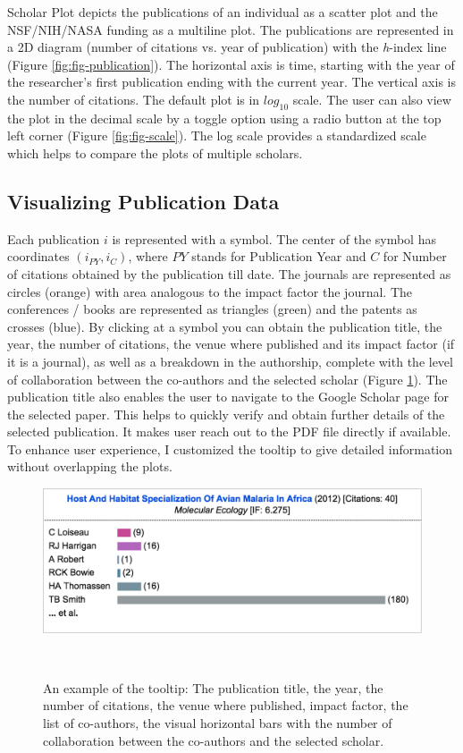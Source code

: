 Scholar Plot depicts the publications of an individual as a scatter plot and the NSF/NIH/NASA funding as a multiline plot. The publications are represented in a 2D diagram (number of citations vs. year of publication) with the {\it h}-index line (Figure \ref{fig:fig-publication}). The horizontal axis is time, starting with the year of the researcher's first publication ending with the current year. The vertical axis is the number of citations. The default plot is in $log_{10}$ scale. The user can also view the plot in the decimal scale by a toggle option using a radio button at the top left corner (Figure \ref{fig:fig-scale}). The log scale provides a standardized scale which helps to compare the plots of multiple scholars.



\subsection{Visualizing Publication Data}
Each publication $i$ is represented with a symbol. The center of the symbol has coordinates $(i_{PY}, i_{C})$, where $PY$ stands for Publication Year and $C$ for Number of citations obtained by the publication till date. The journals are represented as circles (orange) with area analogous to the impact factor the journal. The conferences / books are represented as triangles (green) and the patents as crosses (blue). By clicking at a symbol you can obtain the publication title, the year, the number of citations, the venue where published and its impact factor (if it is a journal), as well as a breakdown in the authorship, complete with the level of collaboration between the co-authors and the selected scholar (Figure \ref{fig:fig-tooltip}). The publication title also enables the user to navigate to the Google Scholar page for the selected paper. This helps to quickly verify and obtain further details of the selected publication. It makes user reach out to the PDF file directly if available. To enhance user experience, I customized the tooltip to give detailed information without overlapping the plots.

\begin{figure}[H]
\centering
  \includegraphics[width=1\columnwidth]{figures/fig_tooltip}
  \caption{An example of the tooltip: The publication title, the year, the number of citations, the venue where published, impact factor, the list of co-authors, the visual horizontal bars with the number of collaboration between the co-authors and the selected scholar.}~\label{fig:fig-tooltip}
\end{figure}

